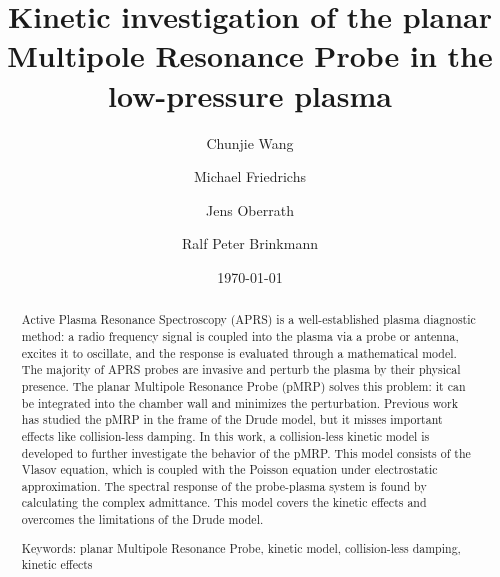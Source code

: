 \documentclass[superscriptaddress,preprint]{revtex4}  %
\begin{document}
\title{Kinetic investigation of the planar Multipole Resonance Probe in the low-pressure plasma}

\author{Chunjie Wang}
\author{Michael Friedrichs}
\author{Jens Oberrath}
\author{Ralf Peter Brinkmann}

\date{\today}


\begin{abstract}
Active Plasma Resonance Spectroscopy (APRS) is a well-established plasma diagnostic method: a radio frequency signal is coupled into the plasma via a probe or antenna, excites it to oscillate, and the response is evaluated through a mathematical model. The majority of APRS probes are invasive and perturb the plasma by their physical presence. The planar Multipole Resonance Probe (pMRP) solves this problem: it can be integrated into the chamber wall and minimizes the perturbation. Previous work has studied the pMRP in the frame of the Drude model, but it misses important effects like collision-less damping. In this work, a collision-less kinetic model is developed to further investigate the behavior of the pMRP. This model consists of the Vlasov equation, which is coupled with the Poisson equation under electrostatic approximation. The spectral response of the probe-plasma system is found by calculating the complex admittance. This model covers the kinetic effects and overcomes the limitations of the Drude model.

\vspace{3mm}
Keywords: planar Multipole Resonance Probe, kinetic model, collision-less damping, kinetic effects 
\vspace{10mm}

\end{abstract}

\maketitle
\newpage
\end{document}
